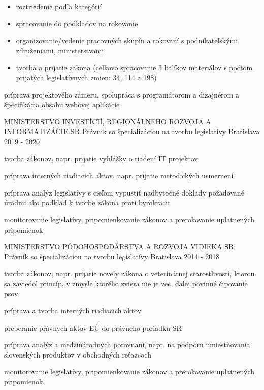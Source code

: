 \begin{cventries}
{\begin{cvitems}
\begin{itemize}[leftmargin=3ex, label=\bullet]
          \item {roztriedenie podľa kategórií}
          \item {spracovanie do podkladov na rokovanie}
          \item {organizovanie/vedenie pracovných skupín a rokovaní s podnikateľskými združeniami, ministerstvami}
          \item {tvorba a prijatie zákona (celkovo spracovanie 3 balíkov materiálov s počtom prijatých legislatívnych zmien: 34, 114 a 198)}
        \end{itemize}
        \item {príprava projektového zámeru, spolupráca s programátorom a dizajnérom a špecifikácia obsahu webovej aplikácie}
      \end{cvitems}
    }

  \cventry
    {MINISTERSTVO INVESTÍCIÍ, REGIONÁLNEHO ROZVOJA A INFORMATIZÁCIE SR} %
    {Právnik so špecializáciou na tvorbu legislatívy} %
    {Bratislava} %
    {2019 - 2020} %
    {
      \begin{cvitems} %
        \item {tvorba zákonov, napr. prijatie vyhlášky o riadení IT projektov}
        \item {príprava interných riadiacich aktov, napr. prijatie metodických usmernení}
        \item {príprava analýz legislatívy s cieľom vypustiť nadbytočné doklady požadované úradmi ako podklad k tvorbe zákona proti byrokracii}
        \item {monitorovanie legislatívy, pripomienkovanie zákonov a prerokovanie uplatnených pripomienok}
      \end{cvitems}
    }

  \cventry
    {MINISTERSTVO PÔDOHOSPODÁRSTVA A ROZVOJA VIDIEKA SR} %
    {Právnik so špecializáciou na tvorbu legislatívy} %
    {Bratislava} %
    {2014 - 2018} %
    {
      \begin{cvitems} %
        \item {tvorba zákonov, napr. prijatie novely zákona o veterinárnej starostlivosti, ktorou sa zaviedol princíp, v zmysle ktorého zviera nie je vec, ďalej povinné čipovanie psov}
        \item {príprava a tvorba interných riadiacich aktov}
        \item {preberanie právnych aktov EÚ do právneho poriadku SR}
        \item {príprava analýz a medzinárodných porovnaní, napr. na podporu umiestňovania slovenských produktov v obchodných reťazcoch}
        \item {monitorovanie legislatívy, pripomienkovanie zákonov a prerokovanie uplatnených pripomienok}
      \end{cvitems}
    }


\end{cventries}
